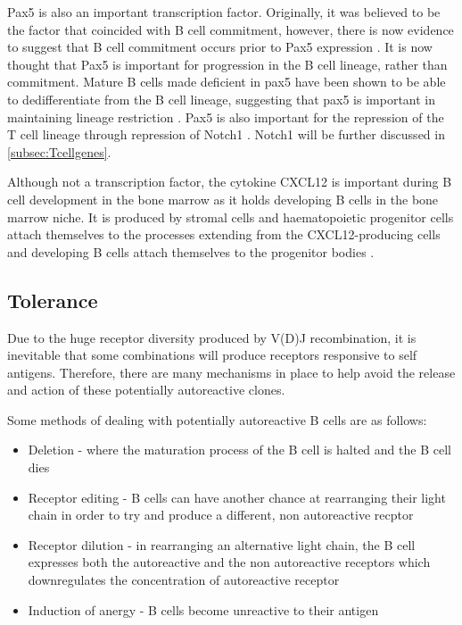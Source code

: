 Pax5 is also an important transcription factor.
Originally, it was believed to be the factor that coincided with B cell commitment, however, there is now evidence to suggest that B cell commitment occurs prior to Pax5 expression \citep{Mansson2008}.
It is now thought that Pax5 is important for progression in the B cell lineage, rather than commitment.
Mature B cells made deficient in pax5 have been shown to be able to dedifferentiate from the B cell lineage, suggesting that pax5 is important in maintaining lineage restriction \citep{Cobaleda2007}.
Pax5 is also important for the repression of the T cell lineage through repression of Notch1 \citep{Souabni2002}.
Notch1 will be further discussed in \cref{subsec:Tcellgenes}.

Although not a transcription factor, the cytokine CXCL12 is important during B cell development in the bone marrow as it holds developing B cells in the bone marrow niche.
It is produced by stromal cells and haematopoietic progenitor cells attach themselves to the processes extending from the CXCL12-producing cells and developing B cells attach themselves to the progenitor bodies \citep{Tokoyoda2004}.

\subsection{Tolerance}

Due to the huge receptor diversity produced by V(D)J recombination, it is inevitable that some combinations will produce receptors responsive to self antigens.
Therefore, there are many mechanisms in place to help avoid the release and action of these potentially autoreactive clones.

Some methods of dealing with potentially autoreactive B cells are as follows:
\begin{itemize}
\item Deletion - where the maturation process of the B cell is halted and the B cell dies \citep{Cornall1995}
\item Receptor editing - B cells can have another chance at rearranging their light chain in order to try and produce a different, non autoreactive recptor \citep{Orduno2009, Gay1993}
\item Receptor dilution - in rearranging an alternative light chain, the B cell expresses both the autoreactive and the non autoreactive receptors which downregulates the concentration of autoreactive receptor \citep{Gay1993, Orduno2009}
\item Induction of anergy - B cells become unreactive to their antigen \citep{Orduno2009}
\end{itemize}

